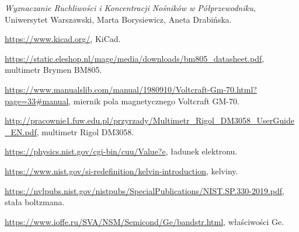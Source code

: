 \documentclass[12pt]{article}
\begin{document}
\newpage
\begin{thebibliography}{6}

\emph{Wyznaczanie Ruchliwości i Koncentracji Nośników w Półprzewodniku}, Uniwersytet Warszawski, Marta Borysiewicz, Aneta Drabińska.

\url{https://www.kicad.org/}, KiCad.

\url{https://static.eleshop.nl/mage/media/downloads/bm805_datasheet.pdf}, multimetr Brymen BM805.

\url{https://www.manualslib.com/manual/1980910/Voltcraft-Gm-70.html?page=33#manual}, miernik pola magnetycznego Voltcraft GM-70.

\url{http://pracownie1.fuw.edu.pl/przyrzady/Multimetr_Rigol_DM3058_UserGuide_EN.pdf}, multimetr Rigol DM3058.

\url{https://physics.nist.gov/cgi-bin/cuu/Value?e}, ładunek elektronu.

\url{https://www.nist.gov/si-redefinition/kelvin-introduction}, kelviny.

\url{https://nvlpubs.nist.gov/nistpubs/SpecialPublications/NIST.SP.330-2019.pdf}, stała boltzmana.

\url{https://www.ioffe.ru/SVA/NSM/Semicond/Ge/bandstr.html}, właściwości Ge.
\end{thebibliography}
\end{document}

